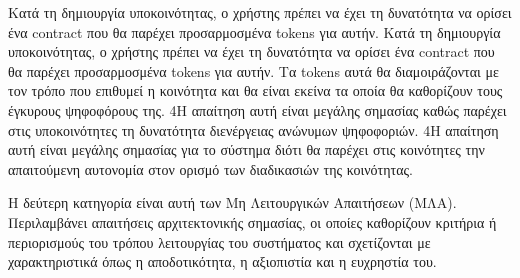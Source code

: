 \begin{enumerate}[label=\textbf{<ΛΑ-\arabic*>}, leftmargin=\parindent, align=left, labelwidth=\parindent, labelsep=0pt]
	\sysReqItem
		{\label{srs:functional-srs-assign-community-contract}}
		{Κατά τη δημιουργία υποκοινότητας, ο χρήστης πρέπει να έχει τη δυνατότητα να ορίσει ένα contract που θα παρέχει προσαρμοσμένα tokens για αυτήν.}
		{Κατά τη δημιουργία υποκοινότητας, ο χρήστης πρέπει να έχει τη δυνατότητα να ορίσει ένα contract που θα παρέχει προσαρμοσμένα tokens για αυτήν. Τα tokens αυτά θα διαμοιράζονται με τον τρόπο που επιθυμεί η κοινότητα και θα είναι εκείνα τα οποία θα καθορίζουν τους έγκυρους ψηφοφόρους της.}
		{4}{Η απαίτηση αυτή είναι μεγάλης σημασίας καθώς παρέχει στις υποκοινότητες τη δυνατότητα διενέργειας ανώνυμων ψηφοφοριών.}
		{4}{Η απαίτηση αυτή είναι μεγάλης σημασίας για το σύστημα διότι θα παρέχει στις κοινότητες την απαιτούμενη αυτονομία στον ορισμό των διαδικασιών της κοινότητας.}
\end{enumerate}

Η δεύτερη κατηγορία είναι αυτή των Μη Λειτουργικών Απαιτήσεων (ΜΛΑ). Περιλαμβάνει απαιτήσεις αρχιτεκτονικής σημασίας, οι οποίες καθορίζουν κριτήρια ή περιορισμούς του τρόπου λειτουργίας του συστήματος και σχετίζονται με χαρακτηριστικά όπως η αποδοτικότητα, η αξιοπιστία και η ευχρηστία του.

